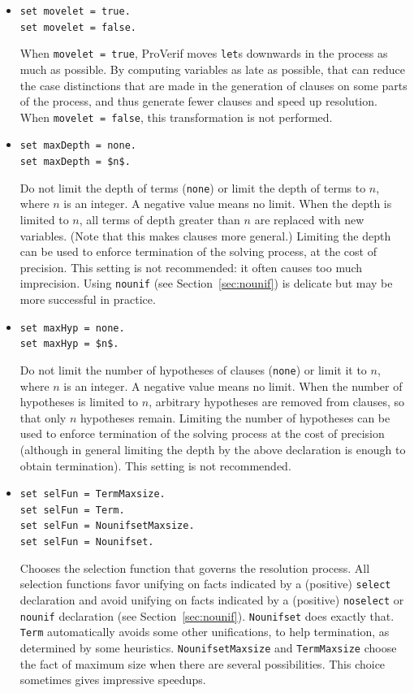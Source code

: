 \documentclass{book}
\begin{document}
\begin{itemize}
\item \lstinline{set movelet = true.}\\
\lstinline{set movelet = false.}

When \lstinline{movelet = true}, ProVerif moves \lstinline!let!s downwards in the
process as much as possible. By computing variables as late as possible,
that can reduce the case distinctions that are made in the generation of
clauses on some parts of the process, and thus generate fewer clauses
and speed up resolution.
When \lstinline{movelet = false}, this transformation is not performed.

\item \lstinline{set maxDepth = none.}\\
\lstinline{set maxDepth = $n$.}

Do not limit the depth of terms (\lstinline{none}) or limit the depth
of terms to $n$, where $n$ is an integer. A negative value means no
limit. When the depth is limited to $n$, all terms of depth greater
than $n$ are replaced with new variables. (Note that this makes
clauses more general.) Limiting the depth can be used to enforce
termination of the solving process, at the cost of precision. This
setting is not recommended: it often causes too much
imprecision. Using \lstinline{nounif} (see Section~\ref{sec:nounif})
is delicate but may be more successful in practice.

\item \lstinline{set maxHyp = none.}\\
\lstinline{set maxHyp = $n$.}

Do not limit the number of hypotheses of clauses (\lstinline{none}) or
limit it to $n$, where $n$ is an integer. A negative value means no
limit. When the number of hypotheses is limited to $n$, arbitrary
hypotheses are removed from clauses, so that only $n$ hypotheses
remain. Limiting the number of hypotheses can be used to enforce
termination of the solving process at the cost of precision
(although in general limiting the depth by the above declaration is
enough to obtain termination). This setting is not recommended.

\item \lstinline{set selFun = TermMaxsize.}\\
\lstinline{set selFun = Term.}\\
\lstinline{set selFun = NounifsetMaxsize.}\\
\lstinline{set selFun = Nounifset.}

Chooses the selection function that governs the resolution process.
All selection functions favor unifying on facts indicated by a (positive)
\lstinline{select} declaration and avoid unifying on facts indicated by a
(positive) \lstinline{noselect} or \lstinline{nounif} declaration
(see Section~\ref{sec:nounif}).
\lstinline{Nounifset} does exactly
that. \lstinline{Term} automatically avoids some other unifications, to
help termination, as determined by some heuristics.
\lstinline{NounifsetMaxsize} and \lstinline{TermMaxsize} choose the fact of
maximum size when there are several possibilities. This choice
sometimes gives impressive speedups.


\end{itemize}
\end{document}
